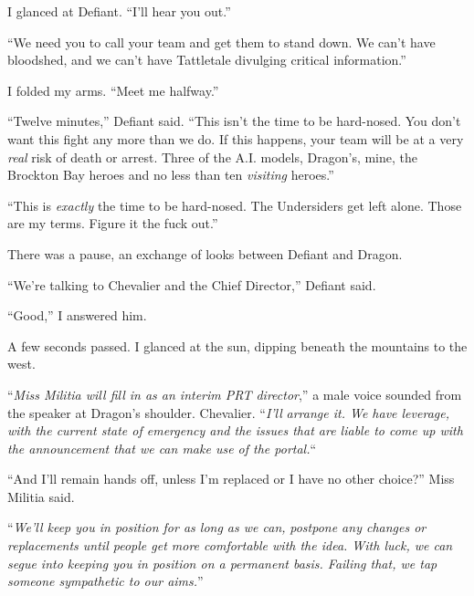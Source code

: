 I glanced at Defiant.  ``I'll hear you out.''



``We need you to call your team and get them to stand down.  We can't have bloodshed, and we can't have Tattletale divulging critical information.''



I folded my arms.  ``Meet me halfway.''



``Twelve minutes,'' Defiant said.  ``This isn't the time to be hard-nosed.  You don't want this fight any more than we do.  If this happens, your team will be at a very \emph{real} risk of death or arrest.  Three of the A.I. models, Dragon's, mine, the Brockton Bay heroes and no less than ten \emph{visiting} heroes.''



``This is \emph{exactly} the time to be hard-nosed.  The Undersiders get left alone.  Those are my terms.  Figure it the fuck out.''



There was a pause, an exchange of looks between Defiant and Dragon.



``We're talking to Chevalier and the Chief Director,'' Defiant said.



``Good,'' I answered him.



A few seconds passed.  I glanced at the sun, dipping beneath the mountains to the west.



``\emph{Miss Militia will fill in as an interim PRT director},'' a male voice sounded from the speaker at Dragon's shoulder.  Chevalier.  ``\emph{I'll }\emph{arrange it.  We have leverage, with the current state of emergency and the issues that are liable to come up with the announcement that we can make use of the portal.}``



``And I'll remain hands off, unless I'm replaced or I have no other choice?'' Miss Militia said.



``\emph{We'll keep you in position for as long as we can, }\emph{postpone any changes or replacements until people get more comfortable with the idea.  With luck, we can segue into keeping you in position on a permanent basis. Failing that, we tap someone sympathetic to our aims.}''



